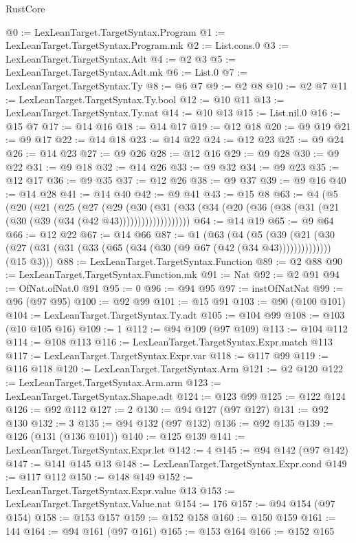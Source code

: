 \begin{lexlean}{RustCore}
\begin{coremodule}
@0 := LexLeanTarget.TargetSyntax.Program
@1 := LexLeanTarget.TargetSyntax.Program.mk
@2 := List.cons.{0}
@3 := LexLeanTarget.TargetSyntax.Adt
@4 := @2 @3
@5 := LexLeanTarget.TargetSyntax.Adt.mk
@6 := List.{0}
@7 := LexLeanTarget.TargetSyntax.Ty
@8 := @6 @7
@9 := @2 @8
@10 := @2 @7
@11 := LexLeanTarget.TargetSyntax.Ty.bool
@12 := @10 @11
@13 := LexLeanTarget.TargetSyntax.Ty.nat
@14 := @10 @13
@15 := List.nil.{0}
@16 := @15 @7
@17 := @14 @16
@18 := @14 @17
@19 := @12 @18
@20 := @9 @19
@21 := @9 @17
@22 := @14 @18
@23 := @14 @22
@24 := @12 @23
@25 := @9 @24
@26 := @14 @23
@27 := @9 @26
@28 := @12 @16
@29 := @9 @28
@30 := @9 @22
@31 := @9 @18
@32 := @14 @26
@33 := @9 @32
@34 := @9 @23
@35 := @12 @17
@36 := @9 @35
@37 := @12 @26
@38 := @9 @37
@39 := @9 @16
@40 := @14 @28
@41 := @14 @40
@42 := @9 @41
@43 := @15 @8
@63 := @4
    (@5
      (@20
        (@21
          (@25
            (@27
              (@29
                (@30
                  (@31 (@33 (@34 (@20 (@36 (@38 (@31 (@21 (@30 (@39 (@34 (@42 @43)))))))))))))))))))
@64 := @14 @19
@65 := @9 @64
@66 := @12 @22
@67 := @14 @66
@87 := @1
    (@63
      (@4
        (@5 (@39 (@21 (@30 (@27 (@31 (@31 (@33 (@65 (@34 (@30 (@9 @67 (@42 (@34 @43))))))))))))))
        (@15 @3)))
@88 := LexLeanTarget.TargetSyntax.Function
@89 := @2 @88
@90 := LexLeanTarget.TargetSyntax.Function.mk
@91 := Nat
@92 := @2 @91
@94 := OfNat.ofNat.{0} @91
@95 := 0
@96 := @94 @95
@97 := instOfNatNat
@99 := @96 (@97 @95)
@100 := @92 @99
@101 := @15 @91
@103 := @90 (@100 @101)
@104 := LexLeanTarget.TargetSyntax.Ty.adt
@105 := @104 @99
@108 := @103 (@10 @105 @16)
@109 := 1
@112 := @94 @109 (@97 @109)
@113 := @104 @112
@114 := @108 @113
@116 := LexLeanTarget.TargetSyntax.Expr.match @113
@117 := LexLeanTarget.TargetSyntax.Expr.var
@118 := @117 @99
@119 := @116 @118
@120 := LexLeanTarget.TargetSyntax.Arm
@121 := @2 @120
@122 := LexLeanTarget.TargetSyntax.Arm.arm
@123 := LexLeanTarget.TargetSyntax.Shape.adt
@124 := @123 @99
@125 := @122 @124
@126 := @92 @112
@127 := 2
@130 := @94 @127 (@97 @127)
@131 := @92 @130
@132 := 3
@135 := @94 @132 (@97 @132)
@136 := @92 @135
@139 := @126 (@131 (@136 @101))
@140 := @125 @139
@141 := LexLeanTarget.TargetSyntax.Expr.let
@142 := 4
@145 := @94 @142 (@97 @142)
@147 := @141 @145 @13
@148 := LexLeanTarget.TargetSyntax.Expr.cond
@149 := @117 @112
@150 := @148 @149
@152 := LexLeanTarget.TargetSyntax.Expr.value @13
@153 := LexLeanTarget.TargetSyntax.Value.nat
@154 := 176
@157 := @94 @154 (@97 @154)
@158 := @153 @157
@159 := @152 @158
@160 := @150 @159
@161 := 144
@164 := @94 @161 (@97 @161)
@165 := @153 @164
@166 := @152 @165

\end{coremodule}
\end{lexlean}
